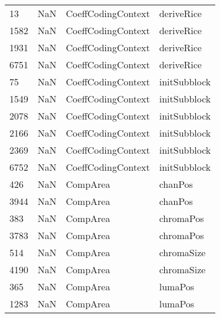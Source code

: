 \begin{tabular}{llll}
13   &                   NaN &         CoeffCodingContext &                                deriveRice \\
1582 &                   NaN &         CoeffCodingContext &                                deriveRice \\
1931 &                   NaN &         CoeffCodingContext &                                deriveRice \\
6751 &                   NaN &         CoeffCodingContext &                                deriveRice \\
75   &                   NaN &         CoeffCodingContext &                              initSubblock \\
1549 &                   NaN &         CoeffCodingContext &                              initSubblock \\
2078 &                   NaN &         CoeffCodingContext &                              initSubblock \\
2166 &                   NaN &         CoeffCodingContext &                              initSubblock \\
2369 &                   NaN &         CoeffCodingContext &                              initSubblock \\
6752 &                   NaN &         CoeffCodingContext &                              initSubblock \\
426  &                   NaN &                   CompArea &                                   chanPos \\
3944 &                   NaN &                   CompArea &                                   chanPos \\
383  &                   NaN &                   CompArea &                                 chromaPos \\
3783 &                   NaN &                   CompArea &                                 chromaPos \\
514  &                   NaN &                   CompArea &                                chromaSize \\
4190 &                   NaN &                   CompArea &                                chromaSize \\
365  &                   NaN &                   CompArea &                                   lumaPos \\
1283 &                   NaN &                   CompArea &                                   lumaPos \\

\end{tabular}
